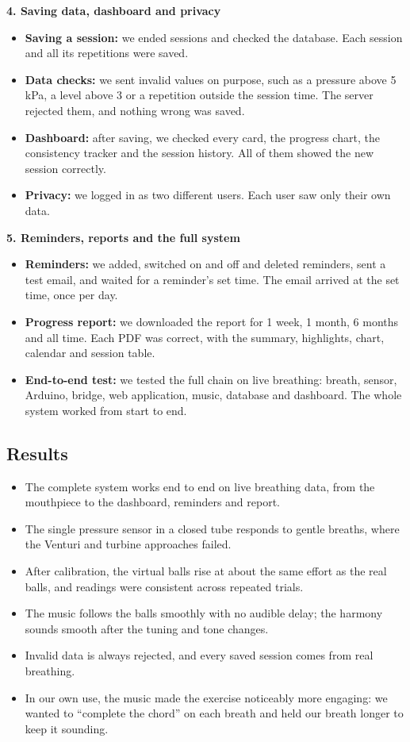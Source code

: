 \documentclass[12pt,a4paper]{article}
\begin{document}
\textbf{4. Saving data, dashboard and privacy}
\begin{itemize}
  \item \textbf{Saving a session:} we ended sessions and checked the database. Each session and all its repetitions were saved.
  \item \textbf{Data checks:} we sent invalid values on purpose, such as a pressure above 5\,kPa, a level above 3 or a repetition outside the session time. The server rejected them, and nothing wrong was saved.
  \item \textbf{Dashboard:} after saving, we checked every card, the progress chart, the consistency tracker and the session history. All of them showed the new session correctly.
  \item \textbf{Privacy:} we logged in as two different users. Each user saw only their own data.
\end{itemize}

\textbf{5. Reminders, reports and the full system}
\begin{itemize}
  \item \textbf{Reminders:} we added, switched on and off and deleted reminders, sent a test email, and waited for a reminder's set time. The email arrived at the set time, once per day.
  \item \textbf{Progress report:} we downloaded the report for 1 week, 1 month, 6 months and all time. Each PDF was correct, with the summary, highlights, chart, calendar and session table.
  \item \textbf{End-to-end test:} we tested the full chain on live breathing: breath, sensor, Arduino, bridge, web application, music, database and dashboard. The whole system worked from start to end.
\end{itemize}

\subsection{Results}
\begin{itemize}
  \item The complete system works end to end on live breathing data, from the mouthpiece to the dashboard, reminders and report.
  \item The single pressure sensor in a closed tube responds to gentle breaths, where the Venturi and turbine approaches failed.
  \item After calibration, the virtual balls rise at about the same effort as the real balls, and readings were consistent across repeated trials.
  \item The music follows the balls smoothly with no audible delay; the harmony sounds smooth after the tuning and tone changes.
  \item Invalid data is always rejected, and every saved session comes from real breathing.
  \item In our own use, the music made the exercise noticeably more engaging: we wanted to ``complete the chord'' on each breath and held our breath longer to keep it sounding.
\end{itemize}
\end{document}
